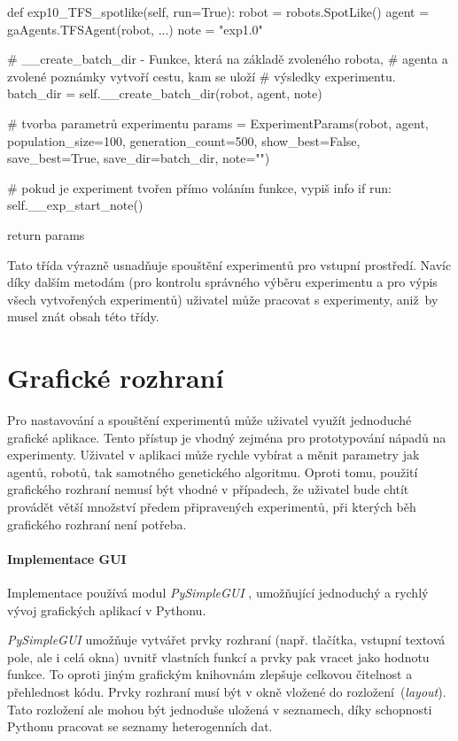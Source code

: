 \begin{code}
def exp10_TFS_spotlike(self, run=True):
    robot = robots.SpotLike()
    agent = gaAgents.TFSAgent(robot, ...)
    note = "exp1.0"

    # __create_batch_dir - Funkce, která na základě zvoleného robota, 
    # agenta a zvolené poznámky vytvoří cestu, kam se uloží 
    # výsledky experimentu.
    batch_dir = self.__create_batch_dir(robot, agent, note) 

    # tvorba parametrů experimentu
    params = ExperimentParams(robot, 
                              agent,
                              population_size=100,
                              generation_count=500,
                              show_best=False,
                              save_best=True,
                              save_dir=batch_dir,
                              note="")

    # pokud je experiment tvořen přímo voláním funkce, vypiš info
    if run: 
        self.__exp_start_note()

    return params
\end{code}

Tato třída výrazně usnadňuje spouštění experimentů pro vstupní prostředí. Navíc
díky dalším metodám (pro kontrolu správného výběru experimentu a pro výpis
všech vytvořených experimentů) uživatel může pracovat s experimenty,
aniž~by musel znát obsah této třídy.

\section{Grafické rozhraní} \label{imp:GUI}
Pro nastavování a spouštění experimentů může uživatel využít jednoduché
grafické aplikace. Tento přístup je vhodný zejména pro prototypování nápadů na
experimenty. Uživatel v aplikaci může rychle vybírat a měnit parametry jak
agentů, robotů, tak samotného genetického algoritmu. Oproti tomu, použití
grafického rozhraní nemusí být vhodné v případech, že uživatel bude chtít
provádět větší množství předem připravených experimentů, při kterých běh
grafického rozhraní není potřeba.

\paragraph{Implementace GUI}
Implementace používá modul \emph{PySimpleGUI} \citep{pysimplegui}, umožňující
jednoduchý a rychlý vývoj grafických aplikací v Pythonu. 

\emph{PySimpleGUI} umožňuje vytvářet prvky rozhraní (např.
tlačítka, vstupní textová pole, ale i celá okna) uvnitř vlastních funkcí a
prvky pak vracet jako hodnotu funkce. To oproti jiným grafickým knihovnám
zlepšuje celkovou čitelnost a přehlednost kódu. Prvky rozhraní musí být v okně
vložené do rozložení~(\emph{layout}). Tato rozložení ale mohou být jednoduše
uložená v seznamech, díky schopnosti Pythonu pracovat se seznamy
heterogenních dat.

